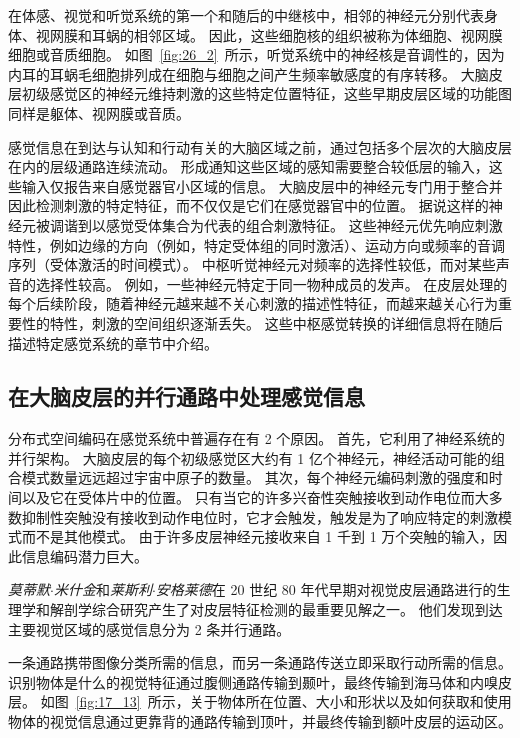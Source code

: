 在体感、视觉和听觉系统的第一个和随后的中继核中，相邻的神经元分别代表身体、视网膜和耳蜗的相邻区域。 
因此，这些细胞核的组织被称为体细胞、视网膜细胞或音质细胞。 
如图~\ref{fig:26_2}~所示，听觉系统中的神经核是音调性的，因为内耳的耳蜗毛细胞排列成在细胞与细胞之间产生频率敏感度的有序转移。
大脑皮层初级感觉区的神经元维持刺激的这些特定位置特征，这些早期皮层区域的功能图同样是躯体、视网膜或音质。


感觉信息在到达与认知和行动有关的大脑区域之前，通过包括多个层次的大脑皮层在内的层级通路连续流动。
形成通知这些区域的感知需要整合较低层的输入，这些输入仅报告来自感觉器官小区域的信息。
大脑皮层中的神经元专门用于整合并因此检测刺激的特定特征，而不仅仅是它们在感觉器官中的位置。
据说这样的神经元被调谐到以感觉受体集合为代表的组合刺激特征。
这些神经元优先响应刺激特性，例如边缘的方向（例如，特定受体组的同时激活）、运动方向或频率的音调序列（受体激活的时间模式）。
中枢听觉神经元对频率的选择性较低，而对某些声音的选择性较高。
例如，一些神经元特定于同一物种成员的发声。
在皮层处理的每个后续阶段，随着神经元越来越不关心刺激的描述性特征，而越来越关心行为重要性的特性，刺激的空间组织逐渐丢失。
这些中枢感觉转换的详细信息将在随后描述特定感觉系统的章节中介绍。



\subsection{在大脑皮层的并行通路中处理感觉信息}

分布式空间编码在感觉系统中普遍存在有 2 个原因。
首先，它利用了神经系统的并行架构。
大脑皮层的每个初级感觉区大约有 1 亿个神经元，神经活动可能的组合模式数量远远超过宇宙中原子的数量。
其次，每个神经元编码刺激的强度和时间以及它在受体片中的位置。
只有当它的许多兴奋性突触接收到动作电位而大多数抑制性突触没有接收到动作电位时，它才会触发，触发是为了响应特定的刺激模式而不是其他模式。
由于许多皮层神经元接收来自 1 千到 1 万个突触的输入，因此信息编码潜力巨大。


\textit{莫蒂默$\cdot$米什金}和\textit{莱斯利$\cdot$安格莱德}在 20 世纪 80 年代早期对视觉皮层通路进行的生理学和解剖学综合研究产生了对皮层特征检测的最重要见解之一\cite{goodale2013two}。
他们发现到达主要视觉区域的感觉信息分为 2 条并行通路。


一条通路携带图像分类所需的信息，而另一条通路传送立即采取行动所需的信息。
识别物体是什么的视觉特征通过腹侧通路传输到颞叶，最终传输到海马体和内嗅皮层。 
如图~\ref{fig:17_13}~所示，关于物体所在位置、大小和形状以及如何获取和使用物体的视觉信息通过更靠背的通路传输到顶叶，并最终传输到额叶皮层的运动区。


